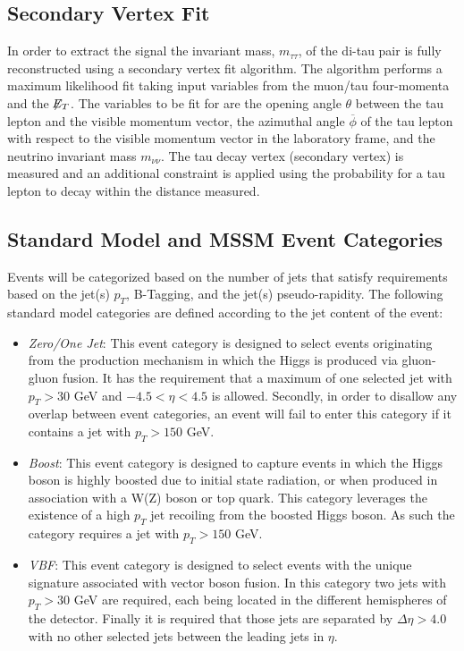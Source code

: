 \subsection{Secondary Vertex Fit}
\label{sec:nsvfit}
In order to extract the signal the invariant mass, $m_{\tau\tau}$, of the di-tau pair is fully reconstructed using a secondary vertex fit algorithm. %
The algorithm performs a maximum likelihood fit taking input variables from the muon/tau four-momenta and the $\not\!\!{E}_{T}$.
The variables to be fit for are the opening angle $\theta$ between the tau lepton and the visible momentum vector, the azimuthal angle $\overline\phi$ of the tau lepton with respect to the visible momentum vector in the laboratory frame, and the neutrino invariant mass $m_{\nu\nu}$.
The tau decay vertex (secondary vertex) is measured and an additional constraint is applied using the probability for a tau lepton to decay within the distance measured.


\subsection{Standard Model and MSSM Event Categories}
\label{sec:categories}
Events will be categorized based on the number of jets that satisfy requirements based on the jet(s) $p_{T}$, B-Tagging, and the jet(s) pseudo-rapidity.
The following standard model categories are defined according to the jet content of the event:
\begin{itemize}
\item \emph{Zero/One Jet}: This event category is designed to select events originating from the production mechanism in which the Higgs is produced via gluon-gluon fusion.
  It has the requirement that a maximum of one selected jet with $p_{T} > 30$ GeV and $-4.5 < \eta < 4.5$ is allowed.
  Secondly, in order to disallow any overlap between event categories, an event will fail to enter this category if it contains a jet with $p_{T} > 150$ GeV.
\item \emph{Boost}: This event category is designed to capture events in which the Higgs boson is highly boosted due to initial state radiation, or when produced in association with a W(Z) boson or top quark.
This category leverages the existence of a high $p_{T}$ jet recoiling from the boosted Higgs boson. 
As such the category requires a jet with $p_{T} > 150$ GeV.
\item \emph{VBF}: This event category is designed to select events with the unique signature associated with vector boson fusion.
  In this category two jets with $p_{T} > 30$ GeV are required, each being located in the different hemispheres of the detector.
  Finally it is required that those jets are separated by $\Delta\eta > 4.0$ with no other selected jets between the leading jets in $\eta$.
\end{itemize}

